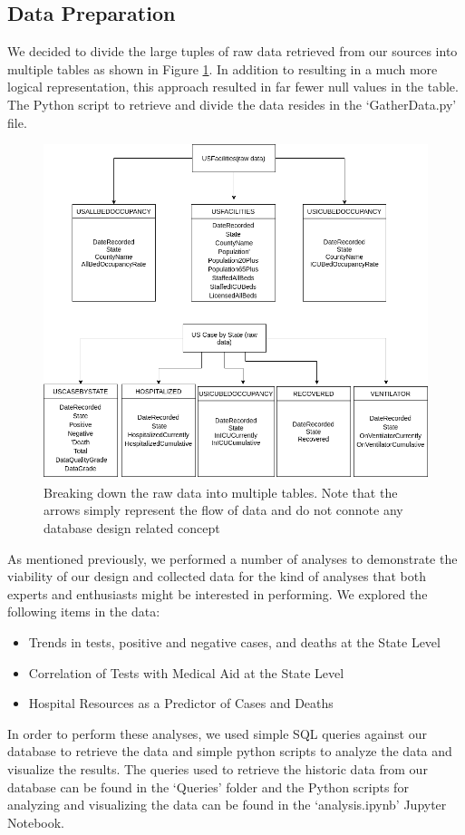 \documentclass[11pt]{article}
\begin{document}
\subsection{Data Preparation}
We decided to divide the large tuples of raw data retrieved from our sources into multiple tables as shown in Figure \ref{fig:tbl_bd}. In addition to resulting in a much more logical representation, this approach resulted in far fewer null values in the table. The Python script to retrieve and divide the data resides in the `GatherData.py' file.
\FloatBarrier
\begin{figure}[h]
    \centering
    \includegraphics[width=\textwidth]{diagrams/data_breakdown.png}
    \caption{Breaking down the raw data into multiple tables. Note that the arrows simply represent the flow of data and do not connote any database design related concept}
    \label{fig:tbl_bd}
\end{figure}
\FloatBarrier

\noindent
As mentioned previously, we performed a number of analyses to demonstrate the viability of our design and collected data for the kind of analyses that both experts and enthusiasts might be interested in performing. We explored the following items in the data:
\begin{itemize}
    \item Trends in tests, positive and negative cases, and deaths at the State Level
    \item Correlation of Tests with Medical Aid at the State Level
    \item Hospital Resources as a Predictor of Cases and Deaths
\end{itemize}
In order to perform these analyses, we used simple SQL queries against our database to retrieve the data and simple python scripts to analyze the data and visualize the results. The queries used to retrieve the historic data from our database can be found in the `Queries' folder and the Python scripts for analyzing and visualizing the data can be found in the `analysis.ipynb' Jupyter Notebook.
\end{document}
